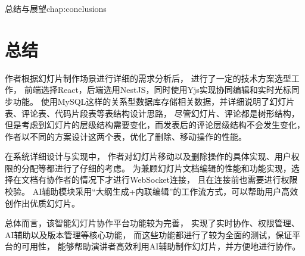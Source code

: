 \begin{cuzchapter}{总结与展望}{chap:conclusions}



	\section{总结}\label{sec:research-summary}

	作者根据幻灯片制作场景进行详细的需求分析后，
	进行了一定的技术方案选型工作，
	前端选择React，后端选用NestJS，同时使用Yjs实现协同编辑和实时光标同步功能。
	使用MySQL这样的关系型数据库存储相关数据，并详细说明了幻灯片表、评论表、代码片段表等表结构设计思路，
	尽管幻灯片、评论都是树形结构，
	但是考虑到幻灯片的层级结构需要变化，而发表后的评论层级结构不会发生变化，
	作者以不同的方案设计这两个表，优化了删除、移动操作的性能。

	在系统详细设计与实现中，
	作者对幻灯片移动以及删除操作的具体实现、用户权限的分配等都进行了仔细的考虑。
	为兼顾幻灯片文档编辑的性能和功能实现，选择在文档有协作者的情况下才进行WebSocket连接，
	且在连接前也需要进行权限校验。
	AI辅助模块采用“大纲生成+内联编辑”的工作流方式，可以帮助用户高效创作出优质幻灯片。


	总体而言，该智能幻灯片协作平台功能较为完善，
	实现了实时协作、权限管理、AI辅助以及版本管理等核心功能，
	而这些功能都进行了较为全面的测试，保证平台的可用性，
	能够帮助演讲者高效利用AI辅助制作幻灯片，并方便地进行协作。







\end{cuzchapter}
